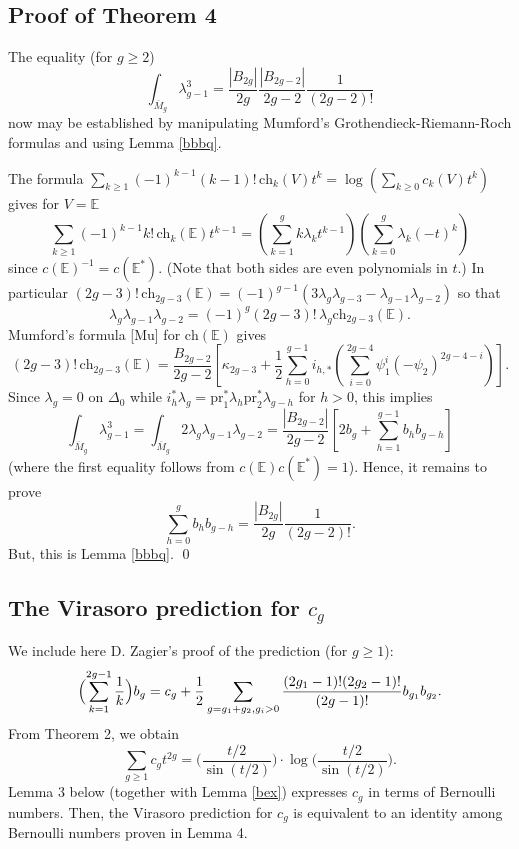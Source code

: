 \documentclass[11 pt]{amsart}
\newcommand{\bpf}{\noindent {\em Proof.} }
\newcommand{\epf}{\qed \vspace{+10pt}}
\newcommand{\hodge}{\mathbb{E}}
\newcommand{\ch}{\text{ch}}
\begin{document}
\subsection{Proof of Theorem 4}


The equality (for $g\geq 2$)
$$
\int_{\overline{M}_g}\lambda_{g-1}^3=\frac{|B_{2g}|}{2g}
\frac{|B_{2g-2}|}{2g-2}\frac1{(2g-2)!}
$$
now  may be established by manipulating Mumford's
Grothendieck-Riemann-Roch formulas and using  Lemma \ref{bbbq}.

\vspace{+10pt}
\bpf The formula 
$\sum_{k\ge1}(-1)^{k-1}(k-1)!\,\ch_k(V)t^k
=\log(\sum_{k\ge0}c_k(V)t^k)$ gives for $V=\hodge$
$$
\sum_{k\ge1}(-1)^{k-1}k!\,\ch_k(\hodge)t^{k-1}=
\left(\sum_{k=1}^g k\lambda_kt^{k-1}\right)
\left(\sum_{k=0}^g \lambda_k(-t)^k\right)
$$
since $c(\hodge)^{-1}=c(\hodge^{*})$.
(Note that both sides are even polynomials in $t$.)
In particular $(2g-3)!\,\ch_{2g-3}(\hodge)=
(-1)^{g-1}(3\lambda_g\lambda_{g-3}-\lambda_{g-1}\lambda_{g-2})$
so that 
$$
\lambda_g\lambda_{g-1}\lambda_{g-2}=
(-1)^g(2g-3)!\,\lambda_g \ch_{2g-3}(\hodge).
$$
Mumford's formula [Mu] for $\ch(\hodge)$ gives
$$
(2g-3)!\,\ch_{2g-3}(\hodge)=
\frac{ B_{2g-2}}{2g-2}\left[
\kappa_{2g-3}+\frac12\sum_{h=0}^{g-1}i_{h,*}
\left(\sum_{i=0}^{2g-4}\psi_1^i(-\psi_2)^{2g-4-i}\right)\right].
$$
Since $\lambda_g=0$ on $\Delta_0$ 
while $i_h^*\lambda_g ={\text{pr}}_1^*\lambda_h{\text{pr}}_2^*\lambda_{g-h}$
for $h>0$, this implies
$$
\int_{\overline{M}_g} \lambda_{g-1}^3=
\int_{\overline{M}_g} 2\lambda_g\lambda_{g-1}\lambda_{g-2}=
\frac{|B_{2g-2}|}{2g-2}
\left[2b_g+\sum_{h=1}^{g-1}b_hb_{g-h}\right]
$$
(where the first equality follows from $c(\hodge) c(\hodge^*)=1$).
Hence, it remains to prove 
$$
\sum_{h=0}^{g}b_hb_{g-h}=\frac{|B_{2g}|}{2g}
\frac1{(2g-2)!}.
$$
But, this is Lemma \ref{bbbq}. \epf



\subsection{The Virasoro prediction for $c_g$}
We include here D. Zagier's proof 
of the prediction  (for $g\geq 1$):
$$\Bigl(
\sum_{k=1}^{2g-1} \frac{1}{k} \Bigr) b_g = c_g + \frac12 \sum_{g=g_1+g_2,
g_i>0}
\frac{(2g_1-1)! (2g_2-1)!}{(2g-1)!} b_{g_1} b_{g_2}.$$
{From} Theorem 2, we obtain
$$\sum_{g\geq 1} c_g t^{2g}= 
\Big( \frac{t/2}{\sin(t/2)} \Big) 
\cdot \log\Big( \frac{t/2}{\sin(t/2)} \Big).$$
Lemma 3 below (together with Lemma \ref{bex}) expresses
$c_g$ in terms of Bernoulli numbers.
Then, the Virasoro prediction for $c_g$ is equivalent to
an identity among Bernoulli numbers proven in Lemma 4.
 
\end{document}
